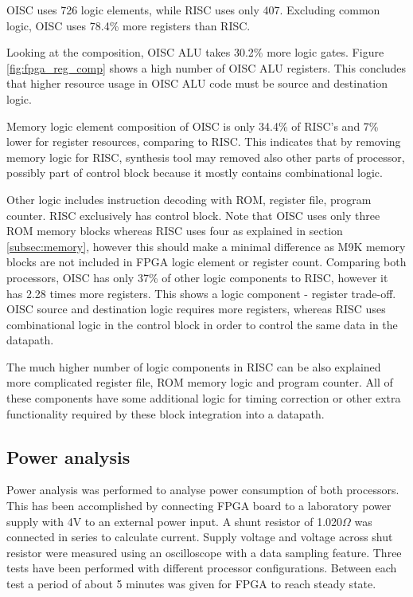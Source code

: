 OISC uses 726 logic elements, while RISC uses only 407. Excluding common logic, OISC uses 78.4\% more registers than RISC.

Looking at the composition, OISC ALU takes 30.2\% more logic gates. Figure \ref{fig:fpga_reg_comp} shows a high number of OISC ALU registers. This concludes that higher resource usage in OISC ALU code must be source and destination logic.

Memory logic element composition of OISC is only 34.4\% of RISC's and 7\% lower for register resources, comparing to RISC. This indicates that by removing memory logic for RISC, synthesis tool may removed also other parts of processor, possibly part of control block because it mostly contains combinational logic.

Other logic includes instruction decoding with ROM, register file, program counter. RISC exclusively has control block. Note that OISC uses only three ROM memory blocks whereas RISC uses four as explained in section \ref{subsec:memory}, however this should make a minimal difference as M9K memory blocks are not included in FPGA logic element or register count. Comparing both processors, OISC has only 37\% of other logic components to RISC, however it has 2.28 times more registers. This shows a logic component - register trade-off. OISC source and destination logic requires more registers, whereas RISC uses combinational logic in the control block in order to control the same data in the datapath. 

The much higher number of logic components in RISC can be also explained more complicated register file, ROM memory logic and program counter. All of these components have some additional logic for timing correction or other extra functionality required by these block integration into a datapath.

\subsection{Power analysis}

Power analysis was performed to analyse power consumption of both processors.
This has been accomplished by connecting FPGA board to a laboratory power supply with 4V to an external power input. A shunt resistor of 1.020$\Omega$ was connected in series to calculate current. Supply voltage and voltage across shut resistor were measured using an oscilloscope with a data sampling feature. Three tests have been performed with different processor configurations. Between each test a period of about 5 minutes was given for FPGA to reach steady state. 


